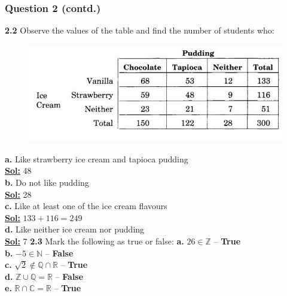 \documentclass[xcolor=svgnames]{beamer}
\begin{document}
\begin{frame}
\frametitle{Question 2 (contd.)}
\begin{multicols}{2}
\small{
\textbf{2.2} Observe the values of the table and find the number of students who:
\begin{center}
\begin{figure}
    \includegraphics[width=\linewidth]{dstut3q2table.png}
\end{figure}
\end{center}
\textbf{a.} Like strawberry ice cream and tapioca pudding \\
\textbf{\underline{Sol:}} 48 \\
\textbf{b.} Do not like pudding \\
\textbf{\underline{Sol:}} 28 \\
\textbf{c.} Like at least one of the ice cream flavours \\
\textbf{\underline{Sol:}} $133 + 116 = 249$ \\
\textbf{d.} Like neither ice cream nor pudding\\
\textbf{\underline{Sol:}} 7 
\vspace{1mm}
\hline
\vspace{1mm}
\textbf{2.3} Mark the following as true or false:
\textbf{a.} $26 \in \mathbb{Z}  $ -- \textbf{True}\\
\textbf{b.} $-5 \in \mathbb{N}  $ -- \textbf{False} \\
\textbf{c.} $\sqrt{2} \notin \mathbb{Q} \cap \mathbb{R}$ -- \textbf{True} \\
\textbf{d.} $\mathbb{Z} \cup \mathbb{Q} = \mathbb{R}$ -- \textbf{False}\\
\textbf{e.} $\mathbb{R} \cap \mathbb{C} = \mathbb{R}$ -- \textbf{True}\\
}
\end{multicols}
\end{frame}
\end{document}
